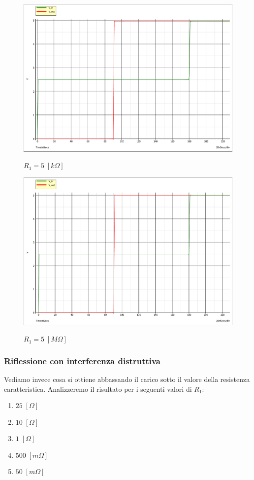 \documentclass[a4paper,12pt]{report}
\begin{document}
\begin{figure}[!htb]
	\centering
	\includegraphics[width=.8\textwidth]{pictures/5kohm.pdf}
	\label{e55cccrgddwg}
	\caption{\label{luegr5ccc5fffegegl} \small $R_1 = 5 \; [k\Omega] $}
\end{figure}

\begin{figure}[!htb]
	\centering
	\includegraphics[width=.8\textwidth]{pictures/5Mohm.pdf}
	\label{e55rdddgddwg}
	\caption{\label{luegr55fdddffegegl} \small $R_1 = 5 \; [M\Omega] $}
\end{figure}

\clearpage

\subsubsection{Riflessione con interferenza distruttiva}

Vediamo invece cosa si ottiene abbassando il carico sotto il valore della resistenza caratteristica. Analizzeremo il risultato per i seguenti valori di $R_1$:
\begin{enumerate}
	\item $25 \; [\Omega]$	
	\item $10 \; [\Omega]$	
	\item $1 \; [\Omega]$
	\item $500 \; [m\Omega]$
	\item $50 \; [m\Omega]$
\end{enumerate}
\end{document}
